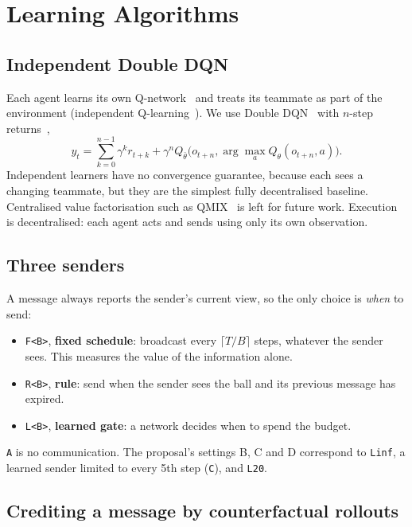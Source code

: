 \documentclass[twocolumn]{article}
\newcommand{\cfg}[1]{\texttt{#1}}
\begin{document}
\section{Learning Algorithms}

\subsection{Independent Double DQN}

Each agent learns its own Q-network~\citep{watkins1992,mnih2015} and treats its teammate as part of the
environment (independent Q-learning~\citep{tan1993}). We use Double DQN~\citep{vanhasselt2016} with
$n$-step returns~\citep{sutton2018},
\begin{equation}
y_t=\sum_{k=0}^{n-1}\gamma^k r_{t+k}+\gamma^n Q_{\bar\theta}\big(o_{t+n},\textstyle\arg\max_{a}Q_\theta(o_{t+n},a)\big).
\label{eq:ddqn}
\end{equation}
Independent learners have no convergence guarantee, because each sees a changing teammate, but they
are the simplest fully decentralised baseline. Centralised value factorisation such as
QMIX~\citep{rashid2018} is left for future work. Execution is decentralised: each agent acts and sends
using only its own observation.

\subsection{Three senders}

A message always reports the sender's current view, so the only choice is \emph{when} to send:
\begin{itemize}
\item \cfg{F<B>}, \textbf{fixed schedule}: broadcast every $\lceil T/B\rceil$ steps, whatever the sender
sees. This measures the value of the information alone.
\item \cfg{R<B>}, \textbf{rule}: send when the sender sees the ball and its previous message has expired.
\item \cfg{L<B>}, \textbf{learned gate}: a network decides when to spend the budget.
\end{itemize}
\cfg{A} is no communication. The proposal's settings B, C and D correspond to \cfg{Linf}, a learned
sender limited to every 5th step (\cfg{C}), and \cfg{L20}.

\subsection{Crediting a message by counterfactual rollouts}\label{sec:gate}
\end{document}
